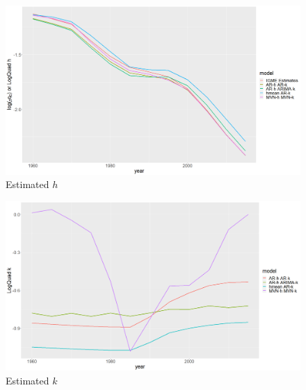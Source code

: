 \documentclass[12pt,a4paper]{article}
\begin{document}
\newpage
\begin{figure}[H]
\includegraphics[width = \linewidth]{Burkina Faso/6/h.png}
\caption{Estimated $h$}
\end{figure}
\begin{figure}[H]
\includegraphics[width = \linewidth]{Burkina Faso/6/k.png}
\caption{Estimated $k$}
\end{figure}
\end{document}
